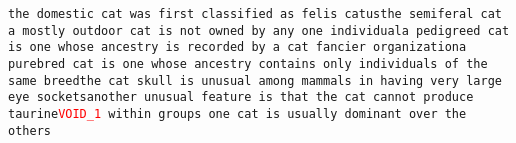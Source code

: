 \texttt{the domestic cat was first classified as felis catus\newline the semiferal cat a mostly outdoor cat is not owned by any one individual\newline a pedigreed cat is one whose ancestry is recorded by a cat fancier organization\newline a purebred cat is one whose ancestry contains only individuals of the same breed\newline the cat skull is unusual among mammals in having very large eye sockets\newline another unusual feature is that the cat cannot produce taurine\newline \textcolor{red}{VOID\_1} within groups one cat is usually dominant over the others}